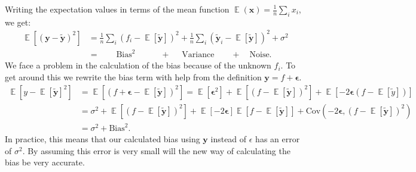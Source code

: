 \documentclass[11pt]{article}
\DeclareMathOperator*{\E}{\mathbb{E}}
\begin{document}
Writing the expectation values in terms of the mean function $\E(\boldsymbol{x}) = \frac{1}{n}\sum_{i} x_i$, we get:
\begin{align*}
    \E[(\boldsymbol{y}- \boldsymbol{\boldsymbol{\tilde{y}}})^2] & = \frac{1}{n}\sum_i (f_i - \E[\boldsymbol{\tilde{y}}])^2 + \frac{1}{n} \sum_i ( \boldsymbol{\tilde{y}}_i - \E[\boldsymbol{\tilde{y}}])^2 + \sigma^2 \\ &= \quad\quad \text{Bias}^2 \quad\quad\quad + \quad \text{ Variance} \quad\quad + \quad \text{Noise}.
\end{align*}
We face a problem in the calculation of the bias because of the unknown $f_i$. To get around this we rewrite the bias term with help from the definition $\boldsymbol{y} = f + \boldsymbol{\epsilon}$.
\begin{align*}
    \E[y - \E[\boldsymbol{\tilde{y}}]^2] & = \E[(f+\boldsymbol{\epsilon} - \E[\boldsymbol{\tilde{y}}])^2] = \E[\boldsymbol{\epsilon}^2] + \E[(f - \E[\boldsymbol{\tilde{y}}])^2] + \E[-2\boldsymbol{\epsilon}(f- \E[\tilde{y}])]      \\
                                         & = \sigma^2 + \E[(f - \E[\boldsymbol{\tilde{y}}])^2] + \E[-2\boldsymbol{\epsilon}]\E[f-\E[\boldsymbol{\tilde{y}}]] + \text{Cov}(-2\boldsymbol{\epsilon}, (f- \E[\boldsymbol{\tilde{y}}])^2) \\
                                         & = \sigma^2 + \text{Bias}^2.
\end{align*}
In practice, this means that our calculated bias using $\boldsymbol{y}$ instead of $\epsilon$ has an error of $\sigma^2$. By assuming this error is very small will the new way of calculating the bias be very accurate.
\end{document}
